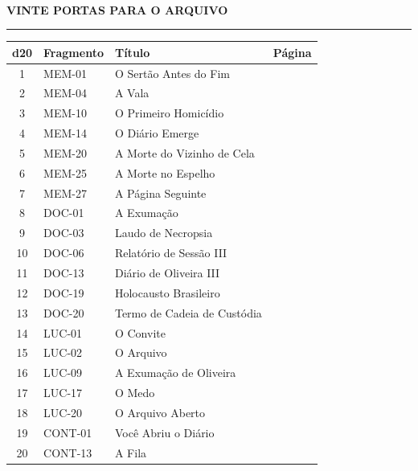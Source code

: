 \clearpage
\thispagestyle{empty}
\begin{rpgdark}
\centering
{}\\[0.25em]
{\scshape\bfseries\small VINTE PORTAS PARA O ARQUIVO}\\[0.3em]
{\color{rpggold}\rule{0.5\textwidth}{0.6pt}}
\end{rpgdark}

\vspace{0.4em}

\vspace{0.25em}
\begin{rpgbox}[ENTRADAS]
\footnotesize
\renewcommand{\arraystretch}{0.98}
\begin{tabularx}{\textwidth}{@{}c l >{\raggedright\arraybackslash}X r@{}}
\toprule
\textbf{d20} & \textbf{Fragmento} & \textbf{Título} & \textbf{Página} \\
\midrule
1 & MEM-01 & O Sertão Antes do Fim & \pageref{frag:MEM-01} \\
2 & MEM-04 & A Vala & \pageref{frag:MEM-04} \\
3 & MEM-10 & O Primeiro Homicídio & \pageref{frag:MEM-10} \\
4 & MEM-14 & O Diário Emerge & \pageref{frag:MEM-14} \\
5 & MEM-20 & A Morte do Vizinho de Cela & \pageref{frag:MEM-20} \\
6 & MEM-25 & A Morte no Espelho & \pageref{frag:MEM-25} \\
7 & MEM-27 & A Página Seguinte & \pageref{frag:MEM-27} \\
8 & DOC-01 & A Exumação & \pageref{frag:DOC-01} \\
9 & DOC-03 & Laudo de Necropsia & \pageref{frag:DOC-03} \\
10 & DOC-06 & Relatório de Sessão III & \pageref{frag:DOC-06} \\
11 & DOC-13 & Diário de Oliveira III & \pageref{frag:DOC-13} \\
12 & DOC-19 & Holocausto Brasileiro & \pageref{frag:DOC-19} \\
13 & DOC-20 & Termo de Cadeia de Custódia & \pageref{frag:DOC-20} \\
14 & LUC-01 & O Convite & \pageref{frag:LUC-01} \\
15 & LUC-02 & O Arquivo & \pageref{frag:LUC-02} \\
16 & LUC-09 & A Exumação de Oliveira & \pageref{frag:LUC-09} \\
17 & LUC-17 & O Medo & \pageref{frag:LUC-17} \\
18 & LUC-20 & O Arquivo Aberto & \pageref{frag:LUC-20} \\
19 & CONT-01 & Você Abriu o Diário & \pageref{frag:CONT-01} \\
20 & CONT-13 & A Fila & \pageref{frag:CONT-13} \\
\bottomrule
\end{tabularx}
\end{rpgbox}

\vspace{0.4em}
\clearpage
